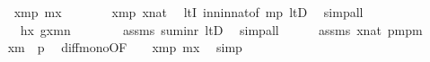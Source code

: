 \begin{isabellebody}
\ \ \ \ \isamarkupfalse%
\ {}{\isacharcolon}{\kern0pt}\ {\isachardoublequoteopen}x{\isasymin}m{\isacharhash}{\kern0pt}{\isacharplus}{\kern0pt}p{\isachardoublequoteclose}\ {\isachardoublequoteopen}m{\isasymle}x{\isachardoublequoteclose}\isanewline
\ \ \ \ \isamarkupfalse%
\ \isamarkupfalse%
\ {\isachardoublequoteopen}x{\isacharless}{\kern0pt}m{\isacharhash}{\kern0pt}{\isacharplus}{\kern0pt}p{\isachardoublequoteclose}\ {\isachardoublequoteopen}x{\isasymin}nat{\isachardoublequoteclose}\ \isamarkupfalse%
\ ltI\ in{\isacharunderscore}{\kern0pt}n{\isacharunderscore}{\kern0pt}in{\isacharunderscore}{\kern0pt}nat{\isacharbrackleft}{\kern0pt}of\ {\isachardoublequoteopen}m{\isacharhash}{\kern0pt}{\isacharplus}{\kern0pt}p{\isachardoublequoteclose}{\isacharbrackright}{\kern0pt}\ ltD\ \isamarkupfalse%
\ simp{\isacharunderscore}{\kern0pt}all\isanewline
\ \ \ \ \isamarkupfalse%
\ {}\isanewline
\ \ \ \ \isamarkupfalse%
\ {}\ {\isacharcolon}{\kern0pt}\ {\isachardoublequoteopen}{\isacharquery}{\kern0pt}h{\isacharbackquote}{\kern0pt}x{\isacharequal}{\kern0pt}\ g{\isacharbackquote}{\kern0pt}{\isacharparenleft}{\kern0pt}x{\isacharhash}{\kern0pt}{\isacharminus}{\kern0pt}m{\isacharparenright}{\kern0pt}{\isacharhash}{\kern0pt}{\isacharplus}{\kern0pt}n{\isachardoublequoteclose}\isanewline
\ \ \ \ \ \ \isamarkupfalse%
\ assms\ sum{\isacharunderscore}{\kern0pt}inr\ ltD\ \isamarkupfalse%
\ simp{\isacharunderscore}{\kern0pt}all\isanewline
\ \ \ \ \isamarkupfalse%
\ assms\ {\isacartoucheopen}x{\isasymin}nat{\isacartoucheclose}\ {\isacartoucheopen}p{\isacharequal}{\kern0pt}m{\isacharhash}{\kern0pt}{\isacharplus}{\kern0pt}p{\isacharhash}{\kern0pt}{\isacharminus}{\kern0pt}m{\isacartoucheclose}\isanewline
\ \ \ \ \isamarkupfalse%
\ {\isachardoublequoteopen}x{\isacharhash}{\kern0pt}{\isacharminus}{\kern0pt}m\ {\isacharless}{\kern0pt}\ p{\isachardoublequoteclose}\ \isamarkupfalse%
\ diff{\isacharunderscore}{\kern0pt}mono{\isacharbrackleft}{\kern0pt}OF\ {\isacharunderscore}{\kern0pt}\ {\isacharunderscore}{\kern0pt}\ {\isacharunderscore}{\kern0pt}\ {\isacartoucheopen}x{\isacharless}{\kern0pt}m{\isacharhash}{\kern0pt}{\isacharplus}{\kern0pt}p{\isacartoucheclose}\ {\isacartoucheopen}m{\isasymle}x{\isacartoucheclose}{\isacharbrackright}{\kern0pt}\ \isamarkupfalse%
\ simp\isanewline
\ \ \ \ \isamarkupfalse%
\ \isamarkupfalse%

\end{isabellebody}
